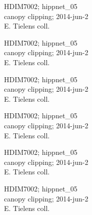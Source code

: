 \documentclass[2pt]{extarticle}
\begin{document}
\noindent
\parbox{0.16\textwidth}{\tiny \raggedright \rule[-0.3\baselineskip]{0pt}{10pt}HDIM7002; hippnet\_05\\ canopy clipping; 2014-jun-2\\ E. Tielens coll.}
\parbox{0.16\textwidth}{\tiny \raggedright \rule[-0.3\baselineskip]{0pt}{10pt}HDIM7002; hippnet\_05\\ canopy clipping; 2014-jun-2\\ E. Tielens coll.}
\parbox{0.16\textwidth}{\tiny \raggedright \rule[-0.3\baselineskip]{0pt}{10pt}HDIM7002; hippnet\_05\\ canopy clipping; 2014-jun-2\\ E. Tielens coll.}
\parbox{0.16\textwidth}{\tiny \raggedright \rule[-0.3\baselineskip]{0pt}{10pt}HDIM7002; hippnet\_05\\ canopy clipping; 2014-jun-2\\ E. Tielens coll.}
\parbox{0.16\textwidth}{\tiny \raggedright \rule[-0.3\baselineskip]{0pt}{10pt}HDIM7002; hippnet\_05\\ canopy clipping; 2014-jun-2\\ E. Tielens coll.}
\parbox{0.16\textwidth}{\tiny \raggedright \rule[-0.3\baselineskip]{0pt}{10pt}HDIM7002; hippnet\_05\\ canopy clipping; 2014-jun-2\\ E. Tielens coll.}
\end{document}
